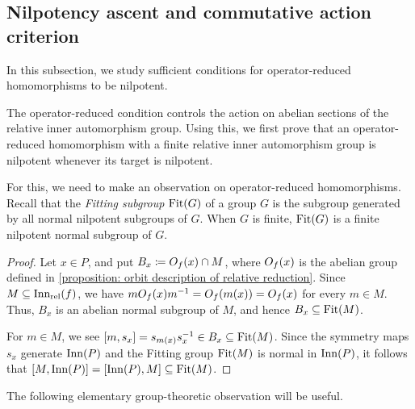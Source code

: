 \subsection{Nilpotency ascent and commutative action criterion}
\label{subsection: quadratic relative actions and nilpotency ascent}

In this subsection, we study sufficient conditions for operator-reduced homomorphisms to be nilpotent.

The operator-reduced condition controls the action on abelian sections of the relative inner automorphism group. Using this, we first prove that an operator-reduced homomorphism with a finite relative inner automorphism group is nilpotent whenever its target is nilpotent.

For this, we need to make an observation on operator-reduced homomorphisms. 
Recall that the \emph{Fitting subgroup} $\operatorname{Fit}(G)$ of a group $G$ is the subgroup generated by all normal nilpotent subgroups of $G$. When $G$ is finite, $\operatorname{Fit}(G)$ is a finite nilpotent normal subgroup of $G$.


\begin{proof}
Let $x\in P$, and put $B_x\coloneqq O_f(x)\cap M$, where $O_f(x)$ is the abelian group defined in \cref{proposition: orbit description of relative reduction}. Since $M\subseteq \operatorname{Inn_{rel}}(f)$, we have $mO_f(x)m^{-1} =O_f(m(x))=O_f(x)$ for every $m\in M$. Thus, $B_x$ is an abelian normal subgroup of $M$, and hence $B_x\subseteq\operatorname{Fit}(M)$.

For $m\in M$, we see $[m,s_x]=s_{m(x)}s_x^{-1}\in B_x\subseteq \operatorname{Fit}(M)$. 
Since the symmetry maps $s_x$ generate $\operatorname{Inn}(P)$ and the Fitting group $\operatorname{Fit}(M)$ is normal in $\operatorname{Inn}(P)$, it follows that $[M, \operatorname{Inn}(P)]=[\operatorname{Inn}(P), M]\subseteq\operatorname{Fit}(M)$.
\end{proof}

The following elementary group-theoretic observation will be useful.

